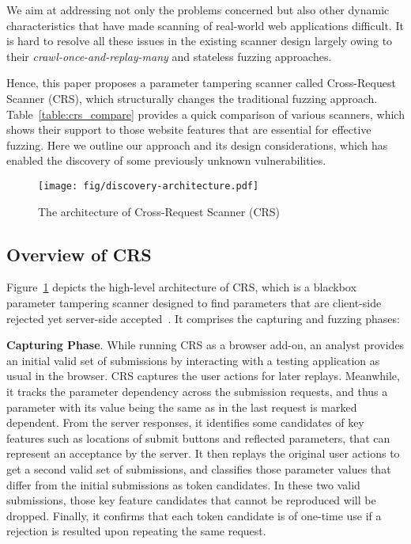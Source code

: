 \documentclass[letter]{sig-alternate-2013}
\begin{document}
We aim at addressing not only the problems concerned but also other dynamic characteristics that have made scanning of real-world web applications difficult. It is hard to resolve all these issues in the existing scanner design largely owing to their \textit{crawl-once-and-replay-many} and stateless fuzzing approaches.


Hence, this paper proposes a parameter tampering scanner called Cross-Request Scanner (CRS), which structurally changes the traditional fuzzing approach. Table~\ref{table:crs_compare} provides a quick comparison of various scanners, which shows their support to those website features that are essential for effective fuzzing. Here we outline our approach and its design considerations, which has enabled the discovery of some previously unknown vulnerabilities.

\begin{figure}[htp]
\centering
\texttt{[image: fig/discovery-architecture.pdf]}
\caption{The architecture of Cross-Request Scanner (CRS)}
\label{fig:arch}
\vspace{-1em}
\end{figure}

\subsection{Overview of CRS}

Figure~\ref{fig:arch} depicts the high-level architecture of CRS, which is a blackbox parameter tampering scanner designed to find parameters that are client-side rejected yet server-side accepted~\cite{immutable}. It comprises the capturing and fuzzing phases:

\textbf{Capturing Phase}. While running CRS as a browser add-on, an analyst provides an initial valid set of submissions by interacting with a testing application as usual in the browser. CRS captures the user actions for later replays. Meanwhile, it tracks the parameter dependency across the submission requests, and thus a parameter with its value being the same as in the last request is marked dependent. From the server responses, it identifies some candidates of key features such as locations of submit buttons and reflected parameters, that can represent an acceptance by the server. It then replays the original user actions to get a second valid set of submissions, and classifies those parameter values that differ from the initial submissions as token candidates. In these two valid submissions, those key feature candidates that cannot be reproduced will be dropped. Finally, it confirms that each token candidate is of one-time use if a rejection is resulted upon repeating the same request. 
\end{document}

